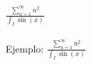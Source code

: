\documentclass[11pt,a4paper]{article}
\author{David Betancourt Montellano}
\begin{document}
$
\frac { \displaystyle{ \sum _{ n=1 }^{ \infty  }{ { n }^{ 2 } } } }{ \int _{ I }^{  }{ \sin { (x) }  }  }
$
\paragraph{}
Ejemplo:
$
\frac { \displaystyle { \sum _{n = 1} ^{ \infty } { {n}^{2} } } }
{ \displaystyle { \int _{I} { \sin { (x) } } } }
$
\end{document}
